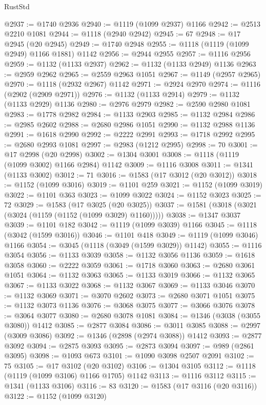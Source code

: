\begin{lexlean}{RustStd}
\begin{coremodule}
@2937 := @1740 @2936
@2940 := @1119 (@1099 @2937) @1166
@2942 := @2513 @2210 @1081
@2944 := @1118 (@2940 @2942)
@2945 := 67
@2948 := @17 @2945 (@20 @2945)
@2949 := @1740 @2948
@2955 := @1118 (@1119 (@1099 @2949) @1166 @1881) @1142
@2956 := @2944 @2955
@2957 := @1116 @2956
@2959 := @1132 (@1133 @2937)
@2962 := @1132 (@1133 @2949) @1136
@2963 := @2959 @2962
@2965 := @2559 @2963 @1051
@2967 := @1149 (@2957 @2965)
@2970 := @1118 (@2932 @2967) @1142
@2971 := @2924 @2970
@2974 := @1116 (@2902 (@2909 @2971))
@2976 := @1132 (@1133 @2914)
@2979 := @1132 (@1133 @2929) @1136
@2980 := @2976 @2979
@2982 := @2590 @2980 @1081
@2983 := @1778 @2982
@2984 := @1133 @2903
@2985 := @1132 @2984
@2986 := @2985 @2602
@2988 := @2680 @2986 @1051
@2990 := @1132 @2988 @1136
@2991 := @1618 @2990
@2992 := @2222 @2991
@2993 := @1718 @2992
@2995 := @2680 @2993 @1081
@2997 := @2983 (@1212 @2995)
@2998 := 70
@3001 := @17 @2998 (@20 @2998)
@3002 := @1304 @3001
@3008 := @1118 (@1119 (@1099 @3002) @1166 @2984) @1142
@3009 := @1116 @3008
@3011 := @1341 (@1133 @3002)
@3012 := 71
@3016 := @1583 (@17 @3012 (@20 @3012))
@3018 := @1152 (@1099 @3016)
@3019 := @1101 @259
@3021 := @1152 (@1099 @3019)
@3022 := @1101 @363
@3023 := @1099 @3022
@3024 := @1152 @3023
@3025 := 72
@3029 := @1583 (@17 @3025 (@20 @3025))
@3037 := @1581 (@3018 (@3021 (@3024 (@1159 (@1152 (@1099 @3029) @1160)))))
@3038 := @1347 @3037
@3039 := @1101 @182
@3042 := @1119 (@1099 @3039) @1166
@3045 := @1118 (@3042 (@1599 @3016))
@3046 := @1101 @418
@3049 := @1119 (@1099 @3046) @1166
@3054 := @3045 (@1118 (@3049 (@1599 @3029)) @1142)
@3055 := @1116 @3054
@3056 := @1133 @3039
@3058 := @1132 @3056 @1136
@3059 := @1618 @3058
@3060 := @2222 @3059
@3061 := @1718 @3060
@3063 := @2680 @3061 @1051
@3064 := @1132 @3063
@3065 := @1133 @3019
@3066 := @1132 @3065
@3067 := @1133 @3022
@3068 := @1132 @3067
@3069 := @1133 @3046
@3070 := @1132 @3069
@3071 := @3070 @2602
@3073 := @2680 @3071 @1051
@3075 := @1132 @3073 @1136
@3076 := @3068 @3075
@3077 := @3066 @3076
@3078 := @3064 @3077
@3080 := @2680 @3078 @1081
@3084 := @1346 (@3038 (@3055 @3080)) @1412
@3085 := @2877 @3084
@3086 := @3011 @3085
@3088 := @2997 (@3009 @3086)
@3092 := @1346 (@2898 (@2974 @3088)) @1412
@3093 := @2877 @3092
@3094 := @2875 @3093
@3095 := @2873 @3094
@3097 := @989 (@2861 @3095)
@3098 := @1093 @673
@3101 := @1090 @3098 @2507 @2091
@3102 := 75
@3105 := @17 @3102 (@20 @3102)
@3106 := @1304 @3105
@3112 := @1118 (@1119 (@1099 @3106) @1166 @1705) @1142
@3113 := @1116 @3112
@3115 := @1341 (@1133 @3106)
@3116 := 83
@3120 := @1583 (@17 @3116 (@20 @3116))
@3122 := @1152 (@1099 @3120)

\end{coremodule}
\end{lexlean}
